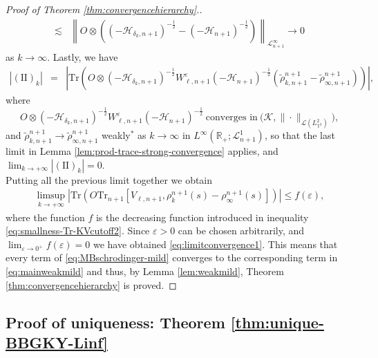 \begin{proof}[Proof of Theorem \ref{thm:convergencehierarchy}.]
\begin{align*}
    \lesssim & \left\| O \otimes \left((- \mathcal{H}_{\delta_k, n +
    1})^{- \frac{1}{2}} - (- \mathcal{H}_{n+1})^{- \frac{1}{2}}\right)
    \right\|_{\mathcal{L}^{\infty}_{n + 1}} \rightarrow 0
  \end{align*}
  as $k \rightarrow \infty$. Lastly, we have
  \begin{eqnarray*}
    | (\mathrm{I} \mathrm{I})_k | & = & \left| \mathrm{Tr} \left(O \otimes (-
    \mathcal{H}_{\delta_k, n+1})^{- \frac{1}{2}} W^{\varepsilon}_{\ell, n + 1}
    (- \mathcal{H}_{n+1})^{- \frac{1}{2}} \left(\tilde{\rho}^{n + 1}_{k, n + 1} -
    \tilde{\rho}^{n + 1}_{\infty, n + 1}\right)\right)\right |,
  \end{eqnarray*}
  where 
  \[
  O \otimes (- \mathcal{H}_{\delta_k, n+1})^{- \frac{1}{2}}
  W^{\varepsilon}_{\ell, n + 1} (- \mathcal{H}_{n+1})^{- \frac{1}{2}} \ \text{converges in} \ \big(\mathcal{K}, \| \cdot
  \|_{\mathcal{L} (L_{\mathbb{T}^3}^2)}\big), 
  \]
  and $\tilde{\rho}^{n + 1}_{k, n +
  1} \rightarrow \tilde{\rho}^{n + 1}_{\infty, n + 1}$ weakly${}^{\ast}$ as $k
  \rightarrow \infty$ in $L^{\infty} (\mathbb{R}_+ ; \mathcal{L}_{n + 1}^1)$,
  so that the last limit in Lemma \ref{lem:prod-trace-strong-convergence}
  applies, and $\lim_{k \rightarrow + \infty} | (\mathrm{I} \mathrm{I})_k | = 0$.\\
  
  Putting all the previous limit together we obtain
  \begin{align}
    \limsup_{k \rightarrow + \infty} \left| \mathrm{Tr} \left(O \mathrm{Tr}_{n + 1}
    [V_{\ell, n + 1}, \rho^{n + 1}_k (s) - \rho^{n + 1}_{\infty} (s)]\right) \right| \leq
    f (\varepsilon),
  \end{align}
  where the function $f$ is the decreasing function introduced in inequality
  \eqref{eq:smallness-Tr-KVcutoff2}. Since $\varepsilon > 0$ can be chosen arbitrarily, and $\lim_{\varepsilon
  \rightarrow 0^+} f (\varepsilon) = 0$ we have obtained
  \eqref{eq:limitconvergence1}. This means that every term of
  \eqref{eq:MBschrodinger-mild} converges to the corresponding term in
  \eqref{eq:mainweakmild} and thus, by Lemma \ref{lem:weakmild}, Theorem
  \ref{thm:convergencehierarchy} is proved.
\end{proof}

\subsection{Proof of uniqueness: Theorem
\ref{thm:unique-BBGKY-Linf}}\label{section:uniqueness}


